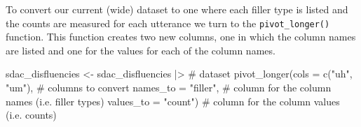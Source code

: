\documentclass[
  letterpaper,
]{latex/krantz}
\newenvironment{Shaded}{\begin{snugshade}}{\end{snugshade}}
\newcommand{\AttributeTok}[1]{\textcolor[rgb]{0.40,0.45,0.13}{#1}}
\newcommand{\CommentTok}[1]{\textcolor[rgb]{0.37,0.37,0.37}{#1}}
\newcommand{\FunctionTok}[1]{\textcolor[rgb]{0.28,0.35,0.67}{#1}}
\newcommand{\NormalTok}[1]{\textcolor[rgb]{0.00,0.23,0.31}{#1}}
\newcommand{\OtherTok}[1]{\textcolor[rgb]{0.00,0.23,0.31}{#1}}
\newcommand{\SpecialCharTok}[1]{\textcolor[rgb]{0.37,0.37,0.37}{#1}}
\newcommand{\StringTok}[1]{\textcolor[rgb]{0.13,0.47,0.30}{#1}}
\begin{document}
To convert our current (wide) dataset to one where each filler type is
listed and the counts are measured for each utterance we turn to the
\texttt{pivot\_longer()} function. This function creates two new
columns, one in which the column names are listed and one for the values
for each of the column names.

\begin{Shaded}
\begin{Highlighting}[]
\NormalTok{sdac\_disfluencies }\OtherTok{\textless{}{-}} 
\NormalTok{  sdac\_disfluencies }\SpecialCharTok{|\textgreater{}} \CommentTok{\# dataset}
  \FunctionTok{pivot\_longer}\NormalTok{(}\AttributeTok{cols =} \FunctionTok{c}\NormalTok{(}\StringTok{"uh"}\NormalTok{, }\StringTok{"um"}\NormalTok{), }\CommentTok{\# columns to convert}
               \AttributeTok{names\_to =} \StringTok{"filler"}\NormalTok{, }\CommentTok{\# column for the column names (i.e. filler types)}
               \AttributeTok{values\_to =} \StringTok{"count"}\NormalTok{) }\CommentTok{\# column for the column values (i.e. counts)}
\end{Highlighting}
\end{Shaded}
\end{document}
